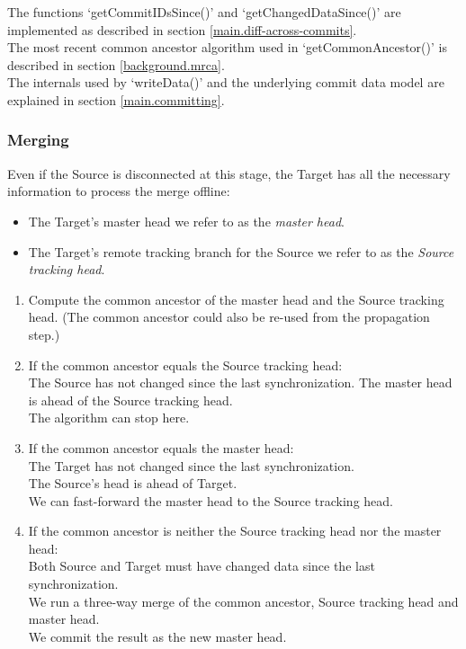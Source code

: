 The functions `getCommitIDsSince()' and `getChangedDataSince()' are implemented as described in section \ref{main.diff-across-commits}.\\
The most recent common ancestor algorithm used in `getCommonAncestor()' is described in section \ref{background.mrca}.\\
The internals used by `writeData()' and the underlying commit data model are explained in section \ref{main.committing}.

\subsubsection{Merging}
Even if the Source is disconnected at this stage, the Target has all the necessary information to process the merge offline:\\

\begin{itemize}
\item The Target's master head we refer to as the \emph{master head}.\\
\item The Target's remote tracking branch for the Source we refer to as the \emph{Source tracking head}.
\end{itemize}

\begin{enumerate}
\item Compute the common ancestor of the master head and the Source tracking head. (The common ancestor could also be re-used from the propagation step.)
\item If the common ancestor equals the Source tracking head:\\
  The Source has not changed since the last synchronization. The master head is ahead of the Source tracking head.\\
  The algorithm can stop here.
\item If the common ancestor equals the master head:\\
  The Target has not changed since the last synchronization.\\
  The Source's head is ahead of Target.\\
  We can fast-forward the master head to the Source tracking head.
\item If the common ancestor is neither the Source tracking head nor the master head:\\
  Both Source and Target must have changed data since the last synchronization.\\
  We run a three-way merge of the common ancestor, Source tracking head and master head.\\
  We commit the result as the new master head.
\end{enumerate}

